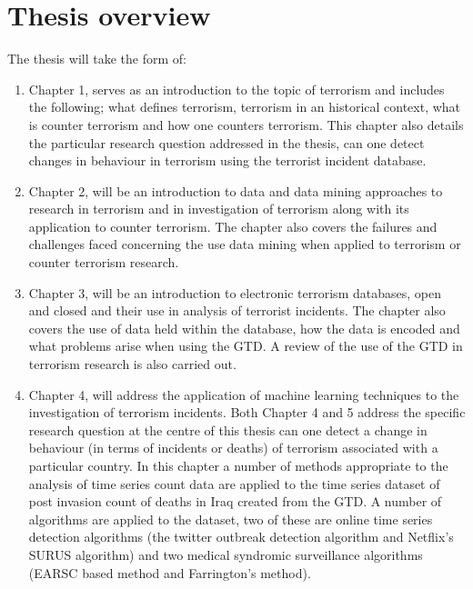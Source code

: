 \section{Thesis overview}
The thesis will take the form of:
\begin{enumerate}
\item Chapter 1, serves as an introduction to the topic of terrorism and includes the following; what defines terrorism, terrorism in an historical context, what is counter terrorism and how one counters terrorism. This chapter also details the particular research question addressed in the thesis, can one detect changes in behaviour in terrorism using the terrorist incident database. 
\item Chapter 2, will be an introduction to data and data mining approaches to research in terrorism and in investigation of terrorism along with its application to counter terrorism. The chapter also covers the failures and challenges faced concerning the use data mining when applied to terrorism or counter terrorism research.
\item Chapter 3, will be an introduction to electronic terrorism databases, open and closed and their use in analysis of terrorist incidents. The chapter also covers the use of data held within the database, how the data is encoded and what problems arise when using the GTD. A review of the use of the GTD in terrorism research is also carried out.
\item Chapter 4, will address the application of machine learning techniques to the investigation of terrorism incidents. Both Chapter 4 and 5  address the specific research question at the centre of this thesis can one detect a change in behaviour (in terms of incidents or deaths) of terrorism associated with a particular country. In this chapter a number of methods appropriate to the analysis of time series count data are applied to the time series dataset of post invasion count of deaths in Iraq created from the GTD. A number of algorithms are applied to the dataset, two of these are online time series detection algorithms (the twitter outbreak detection algorithm and Netflix's SURUS algorithm) and two medical syndromic surveillance algorithms (EARSC based method and Farrington's method). 


\end{enumerate}
